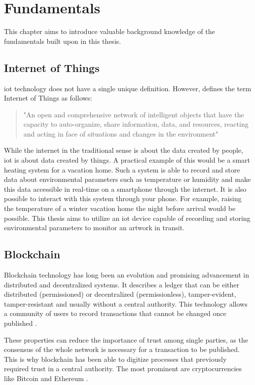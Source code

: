 \chapter{Fundamentals}
\label{chap:technologies}
This chapter aims to introduce valuable background knowledge of the fundamentals built upon in this thesis.

\section{Internet of Things}
\gls{iot} technology does not have a single unique definition. However, \textcite{iot} defines the term Internet of Things as follows:
\begin{quote}
    "An open and comprehensive network of intelligent objects that have the capacity to auto-organize, share information, data, and resources, reacting and acting in face of situations and changes in the environment"
\end{quote}
While the internet in the traditional sense is about the data created by people, \gls{iot} is about data created by things. A practical example of this would be a smart heating system for a vacation home. Such a system is able to record and store data about environmental parameters such as temperature or humidity and make this data accessible in real-time on a smartphone through the internet. It is also possible to interact with this system through your phone. For example, raising the temperature of a winter vacation home the night before arrival would be possible. This thesis aims to utilize an \gls{iot} device capable of recording and storing environmental parameters to monitor an artwork in transit.

\section{Blockchain}
Blockchain technology has long been an evolution and promising advancement in distributed and decentralized systems. It describes a ledger that can be either distributed (permissioned) or decentralized (permissionless), tamper-evident, tamper-resistant and usually without a central authority. This technology allows a community of users to record transactions that cannot be changed once published \parencite{blockchainoverview}.

These properties can reduce the importance of trust among single parties, as the consensus of the whole network is necessary for a transaction to be published. This is why blockchain has been able to digitize processes that previously required trust in a central authority. The most prominent are cryptocurrencies like Bitcoin and Ethereum \cite{bitcoin, ethereum}.

